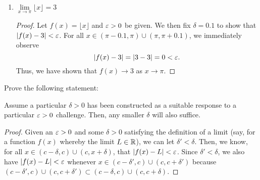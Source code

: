 \begin{problem}
\begin{enumerate}[label=(\alph*)]
\begin{proof}
\begin{itemize}
              The last inequality holds because $x^{2} + 2x + 4 \le 19$ for all
              $x$ such that $\abs{x - 2} < \delta \leq 1$,

            \item When $\eps > 19$, then $\delta = 1$. Then, for all $x$
              such that $\abs{x - 2} < 1$, it follows that
              \begin{align*}
                \abs{f(x) - 8} &= \\
                \abs{(x-2)(x^{2} +2x + 4)} &= \\
                \abs{x-2} \abs{x^{2} + 2x + 4} &< \abs{x^{2} + 2x + 4} \\ 
                                               &\leq 19 \\ 
                                               &< \eps
              \end{align*}
              because for all $x \in (1, 2) \cup (2, 3)$, the expression $x^{2} + 2x + 4$ is bounded above by $19$.

        \end{itemize}
        Thus, we have shown that $f(x) \to 8$ as $x \to 2$. 
      \end{proof}

    \item $\lim\limits_{x \to \pi} \lfloor x \rfloor = 3$ 
      \begin{proof}
        Let $f(x) = \lfloor x \rfloor$ and $\varepsilon > 0$ be given. We then fix $\delta = 0.1$ to show
        that $\left\lvert f(x) - 3 \right\rvert < \varepsilon$. For all $x \in (\pi - 0.1, \pi) \cup (\pi, \pi + 0.1)$, we immediately observe
        \[
          \left\lvert f(x) - 3 \right\rvert = \left\lvert 3 - 3 \right\rvert = 0 < \varepsilon.
        \]
        Thus, we have shown that $f(x) \to 3$ as $x \to \pi$.
      \end{proof}

  \end{enumerate}
\end{problem}


\begin{problem}
  \label{prob:smaller-delta-sufficient}
  Prove the following statement:
    \begin{displayquote}
      Assume a particular $\delta > 0$ has been constructed as a suitable response to
      a particular $\varepsilon > 0$ challenge. Then, any smaller $\delta$ will also suffice.
    \end{displayquote}

  \begin{proof}
    Given an $\varepsilon > 0$ and some $\delta > 0$ satisfying the definition of a
    limit (say, for a function $f(x)$ whereby the limit $L \in \mathbb{R}$), we can let
    $\delta' < \delta$. Then, we know, for all $x \in (c - \delta, c) \cup (c, x + \delta)$, that
    $\left\lvert f(x) - L \right\rvert < \varepsilon$. Since $\delta' < \delta$, we also have $\left\lvert f(x) - L \right\rvert < \varepsilon$ whenever
    $x \in (c - \delta', c) \cup (c, c + \delta')$ because 
    $(c - \delta', c) \cup (c, c + \delta') \subset (c - \delta, c) \cup (c, c + \delta)$.
  \end{proof}
\end{problem}


